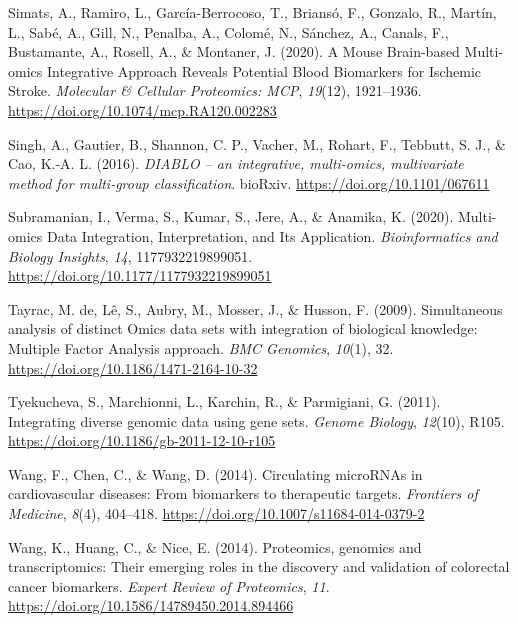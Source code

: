 \documentclass[a4paper, nobind]{templates/ociamthesis}
\newlength{\cslhangindent}
\newenvironment{CSLReferences}[2] %
 {%
  \setlength{\parindent}{0pt}
  \ifodd #1
  \let\oldpar\par
  \def\par{\hangindent=\cslhangindent\oldpar}
  \fi
  \setlength{\parskip}{1mm}
  \setlength{\baselineskip}{6mm}
 }%
 {}
\begin{document}
\begin{CSLReferences}{1}{0}
\leavevmode{}%
Simats, A., Ramiro, L., García-Berrocoso, T., Briansó, F., Gonzalo, R., Martín, L., Sabé, A., Gill, N., Penalba, A., Colomé, N., Sánchez, A., Canals, F., Bustamante, A., Rosell, A., \& Montaner, J. (2020). A {Mouse} {Brain}-based {Multi}-omics {Integrative} {Approach} {Reveals} {Potential} {Blood} {Biomarkers} for {Ischemic} {Stroke}. \emph{Molecular \& Cellular Proteomics: MCP}, \emph{19}(12), 1921--1936. \url{https://doi.org/10.1074/mcp.RA120.002283}

\leavevmode{}%
Singh, A., Gautier, B., Shannon, C. P., Vacher, M., Rohart, F., Tebbutt, S. J., \& Cao, K.-A. L. (2016). \emph{{DIABLO} -- an integrative, multi-omics, multivariate method for multi-group classification}. bioRxiv. \url{https://doi.org/10.1101/067611}

\leavevmode{}%
Subramanian, I., Verma, S., Kumar, S., Jere, A., \& Anamika, K. (2020). Multi-omics {Data} {Integration}, {Interpretation}, and {Its} {Application}. \emph{Bioinformatics and Biology Insights}, \emph{14}, 1177932219899051. \url{https://doi.org/10.1177/1177932219899051}

\leavevmode{}%
Tayrac, M. de, Lê, S., Aubry, M., Mosser, J., \& Husson, F. (2009). Simultaneous analysis of distinct {Omics} data sets with integration of biological knowledge: {Multiple} {Factor} {Analysis} approach. \emph{BMC Genomics}, \emph{10}(1), 32. \url{https://doi.org/10.1186/1471-2164-10-32}

\leavevmode{}%
Tyekucheva, S., Marchionni, L., Karchin, R., \& Parmigiani, G. (2011). Integrating diverse genomic data using gene sets. \emph{Genome Biology}, \emph{12}(10), R105. \url{https://doi.org/10.1186/gb-2011-12-10-r105}

\leavevmode{}%
Wang, F., Chen, C., \& Wang, D. (2014). Circulating {microRNAs} in cardiovascular diseases: From biomarkers to therapeutic targets. \emph{Frontiers of Medicine}, \emph{8}(4), 404--418. \url{https://doi.org/10.1007/s11684-014-0379-2}

\leavevmode{}%
Wang, K., Huang, C., \& Nice, E. (2014). Proteomics, genomics and transcriptomics: {Their} emerging roles in the discovery and validation of colorectal cancer biomarkers. \emph{Expert Review of Proteomics}, \emph{11}. \url{https://doi.org/10.1586/14789450.2014.894466}


\end{CSLReferences}
\end{document}
